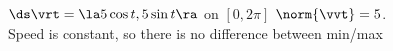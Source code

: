 {$\ds \vrt = \la 5\cos t,5\sin t \ra$ on $[0,2\pi]$
}
{
$\norm{\vvt} = 5$. \\
Speed is constant, so there is no difference between min/max
}